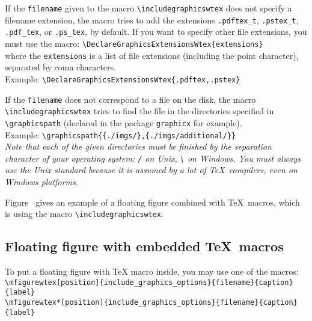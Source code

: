 \documentclass[book]{upmethodology-document}
\begin{document}
If the \texttt{filename} given to the macro \texttt{{\textbackslash}includegraphicswtex} does not specify a filename extension, the macro tries to add the extensions \texttt{.pdftex\_t}, \texttt{.pstex\_t}, \texttt{.pdf\_tex}, or \texttt{.ps\_tex}, by default. If you want to specify other file extensions, you must use the macro:
\texttt{{\textbackslash}DeclareGraphicsExtensionsWtex\{extensions\}} \\
where the \texttt{extensions} is a list of file extensions (including the point character), separated by coma characters. \\
Example: \texttt{{\textbackslash}DeclareGraphicsExtensionsWtex\{.pdftex,.pstex\}}

If the \texttt{filename} does not correspond to a file on the disk, the macro \texttt{{\textbackslash}includegraphicswtex} tries to find the file in the directories specified in \texttt{{\textbackslash}graphicspath} (declared in the package \texttt{graphicx} for example). \\
Example: \texttt{{\textbackslash}graphicspath\{\{./imgs/\},\{./imgs/additional/\}\}} \\
\emph{Note that each of the given directories must be finished by the separation character of your operating system: \texttt{/} on Unix, \texttt{\textbackslash} on Windows. You must always use the Unix standard because it is assumed by a lot of \TeX\ compilers, even on Windows platforms.}

Figure~ gives an example of a floating figure combined with \TeX\ macros, which is using the macro \texttt{{\textbackslash}includegraphicswtex}.

\subsection{Floating figure with embedded \TeX\ macros}

To put a floating figure with \TeX\xspace macro inside, you may use one of the macros:
\texttt{{\textbackslash}mfigurewtex[position]\{include\_graphics\_options\}\{filename\}\{caption\}\{label\}} \\
\texttt{{\textbackslash}mfigurewtex*[position]\{include\_graphics\_options\}\{filename\}\{caption\}\{label\}}
\end{document}
